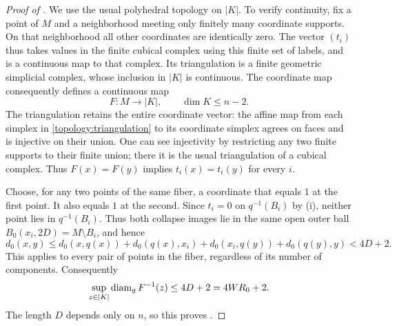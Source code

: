 \begin{proof}[Proof of ]
We use the usual polyhedral topology on $|K|$.  To verify continuity,
fix a point of $M$ and a neighborhood meeting only finitely many
coordinate supports.  On that neighborhood all other coordinates
are identically zero.  The vector $(t_i)$ thus takes values in the
finite cubical complex using this finite set of labels, and is a
continuous map to that complex.  Its triangulation is a
finite geometric simplicial complex, whose inclusion in $|K|$ is
continuous.  The coordinate map consequently defines a continuous map
\begin{equation}\label{topology:final-map}
 F:M\longrightarrow |K|,\qquad \dim K\le n-2.
\end{equation}
The triangulation retains the entire coordinate vector: the affine
map from each simplex in \eqref{topology:triangulation} to its coordinate
simplex agrees on faces and is injective on their union.  One can see
injectivity by restricting any two finite supports to their finite
union; there it is the usual triangulation of a cubical complex.
Thus $F(x)=F(y)$ implies $t_i(x)=t_i(y)$ for every $i$.

Choose, for any two points of the same fiber, a coordinate that equals
$1$ at the first point.  It also equals $1$ at the second.  Since
$t_i=0$ on $q^{-1}(B_i)$ by (i), neither point lies in $q^{-1}(B_i)$.
Thus both collapse images lie in the same open outer ball
$B_0(x_i,2D)=M\setminus B_i$, and hence
\[
 d_0(x,y)
 \le d_0(x,q(x))+d_0(q(x),x_i)
       +d_0(x_i,q(y))+d_0(q(y),y)
 <4D+2.
\]
This applies to every pair of points in the fiber, regardless of its
number of components.  Consequently
\begin{equation}\label{topology:fiber-bound}
 \sup_{z\in|K|}\operatorname{diam}_{g}F^{-1}(z)\le4D+2=4WR_0+2.
\end{equation}
The length $D$ depends only on $n$, so this proves
.
\end{proof}
